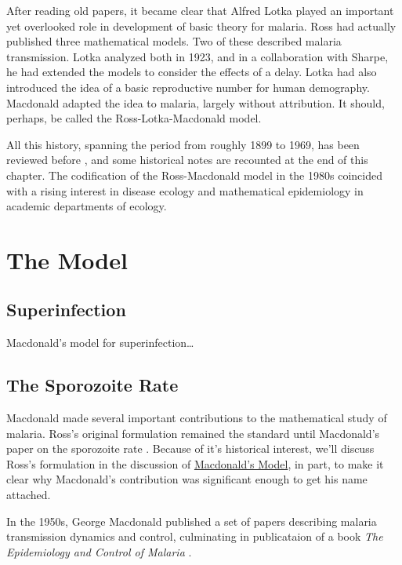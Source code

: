 \documentclass[
]{book}
\begin{document}
After reading old papers, it became clear that Alfred Lotka played an important yet overlooked role in development of basic theory for malaria.
Ross had actually published three mathematical models.
Two of these described malaria transmission.
Lotka analyzed both in 1923, and in a collaboration with Sharpe, he had extended the models to consider the effects of a delay.
Lotka had also introduced the idea of a basic reproductive number for human demography.
Macdonald adapted the idea to malaria, largely without attribution.
It should, perhaps, be called the Ross-Lotka-Macdonald model.

All this history, spanning the period from roughly 1899 to 1969, has been reviewed before \autocite{SmithDL2012_RossMacdonald}, and some historical notes are recounted at the end of this chapter.
The codification of the Ross-Macdonald model in the 1980s coincided with a rising interest in disease ecology and mathematical epidemiology in academic departments of ecology.

\section{The Model}\label{the-model}

\subsection{Superinfection}\label{superinfection}

Macdonald's model for superinfection\ldots{}

\subsection{The Sporozoite Rate}\label{the-sporozoite-rate}

Macdonald made several important contributions to the mathematical study of malaria. Ross's original formulation remained the standard until Macdonald's paper on the sporozoite rate \autocite{MacdonaldG1952Sporozoite}. Because of it's historical interest, we'll discuss Ross's formulation in the discussion of \hyperref[macdonalds-model]{Macdonald's Model}, in part, to make it clear why Macdonald's contribution was significant enough to get his name attached.

In the 1950s, George Macdonald published a set of papers describing malaria transmission dynamics and control, culminating in publicataion of a book \emph{The Epidemiology and Control of Malaria} \autocite{MacdonaldG1957Book}.
\end{document}
